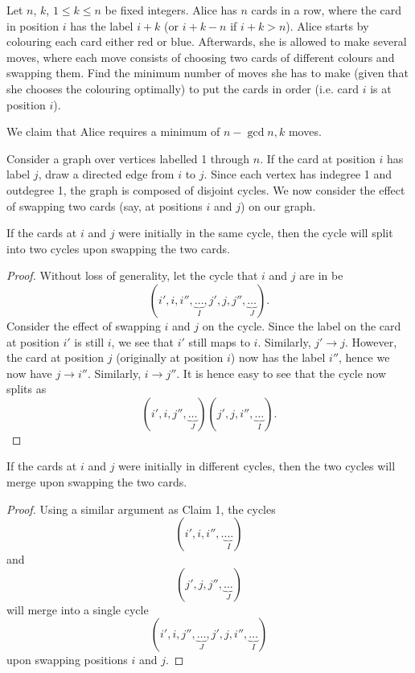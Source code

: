\begin{question}[$n-\gcd{n, k}$]\label{A::2022-O-2-4}
    Let $n$, $k$, $1 \leq k \leq n$ be fixed integers. Alice has $n$ cards in a row, where the card in position $i$ has the label $i + k$ (or $i + k - n$ if $i + k > n$). Alice starts by colouring each card either red or blue. Afterwards, she is allowed to make several moves, where each move consists of choosing two cards of different colours and swapping them. Find the minimum number of moves she has to make (given that she chooses the colouring optimally) to put the cards in order (i.e. card $i$ is at position $i$).
\end{question}
\begin{solution*}
    We claim that Alice requires a minimum of $n - \gcd{n, k}$ moves.

    Consider a graph over vertices labelled 1 through $n$. If the card at position $i$ has label $j$, draw a directed edge from $i$ to $j$. Since each vertex has indegree 1 and outdegree 1, the graph is composed of disjoint cycles. We now consider the effect of swapping two cards (say, at positions $i$ and $j$) on our graph.

    \begin{claim}
        If the cards at $i$ and $j$ were initially in the same cycle, then the cycle will split into two cycles upon swapping the two cards.
    \end{claim}
    \begin{proof}
        Without loss of generality, let the cycle that $i$ and $j$ are in be \[(i', i, i'', \underbrace{\ldots}_{I}, j', j, j'', \underbrace{\ldots}_{J}).\] Consider the effect of swapping $i$ and $j$ on the cycle. Since the label on the card at position $i'$ is still $i$, we see that $i'$ still maps to $i$. Similarly, $j' \to j$. However, the card at position $j$ (originally at position $i$) now has the label $i''$, hence we now have $j \to i''$. Similarly, $i \to j''$. It is hence easy to see that the cycle now splits as \[(i', i, j'', \underbrace{\ldots}_{J})(j', j, i'', \underbrace{\ldots}_{I}).\]
    \end{proof}

    \begin{claim}
        If the cards at $i$ and $j$ were initially in different cycles, then the two cycles will merge upon swapping the two cards.
    \end{claim}
    \begin{proof}
        Using a similar argument as Claim 1, the cycles \[(i', i, i'',. \underbrace{\ldots}_{I})\] and \[(j', j, j'', \underbrace{\ldots}_{J})\] will merge into a single cycle \[(i', i, j'', \underbrace{\ldots}_{J}, j', j, i'', \underbrace{\ldots}_{I})\] upon swapping positions $i$ and $j$.
    \end{proof}


\end{solution*}
